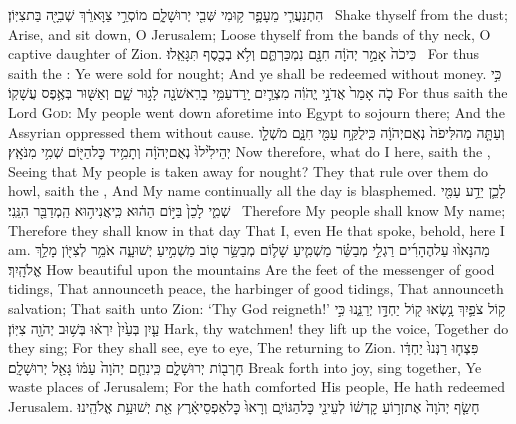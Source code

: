 {הִתְנַעֲרִ֧י מֵעָפָ֛ר ק֥וּמִי שְּׁבִ֖י יְרוּשָׁלָ֑͏ִם  מוֹסְרֵ֣י צַוָּארֵ֔ךְ שְׁבִיָּ֖ה בַּת\maqqaf צִיּֽוֹן׃ \setuma }
{Shake thyself from the dust; Arise, and sit down, O Jerusalem; Loose thyself from the bands of thy neck, O captive daughter of Zion.}
{כִּי\maqqaf כֹה֙ אָמַ֣ר יְהֹוָ֔ה חִנָּ֖ם נִמְכַּרְתֶּ֑ם וְלֹ֥א בְכֶ֖סֶף תִּגָּאֵֽלוּ׃ \setuma }
{For thus saith the \lord: Ye were sold for nought; And ye shall be redeemed without money.}
{כִּ֣י כֹ֤ה אָמַר֙ אֲדֹנָ֣י יֱהֹוִ֔ה מִצְרַ֛יִם יָֽרַד\maqqaf עַמִּ֥י בָרִֽאשֹׁנָ֖ה לָג֣וּר שָׁ֑ם וְאַשּׁ֖וּר בְּאֶ֥פֶס עֲשָׁקֽוֹ׃}
{For thus saith the Lord \textsc{God}: My people went down aforetime into Egypt to sojourn there; And the Assyrian oppressed them without cause.}
{וְעַתָּ֤ה מַה\maqqaf לִּי\maqqaf פֹה֙ נְאֻם\maqqaf יְהֹוָ֔ה כִּֽי\maqqaf לֻקַּ֥ח עַמִּ֖י חִנָּ֑ם מֹשְׁלָ֤ו יְהֵילִ֙ילוּ֙ נְאֻם\maqqaf יְהֹוָ֔ה וְתָמִ֥יד כׇּל\maqqaf הַיּ֖וֹם שְׁמִ֥י מִנֹּאָֽץ׃}
{Now therefore, what do I here, saith the \lord, Seeing that My people is taken away for nought? They that rule over them do howl, saith the \lord, And My name continually all the day is blasphemed.}
{לָכֵ֛ן יֵדַ֥ע עַמִּ֖י שְׁמִ֑י לָכֵן֙ בַּיּ֣וֹם הַה֔וּא כִּֽי\maqqaf אֲנִי\maqqaf ה֥וּא הַֽמְדַבֵּ֖ר הִנֵּֽנִי׃ \setuma }
{Therefore My people shall know My name; Therefore they shall know in that day That I, even He that spoke, behold, here I am.}
{מַה\maqqaf נָּאו֨וּ עַל\maqqaf הֶהָרִ֜ים רַגְלֵ֣י מְבַשֵּׂ֗ר מַשְׁמִ֧יעַ שָׁל֛וֹם מְבַשֵּׂ֥ר ט֖וֹב מַשְׁמִ֣יעַ יְשׁוּעָ֑ה אֹמֵ֥ר לְצִיּ֖וֹן מָלַ֥ךְ אֱלֹהָֽיִךְ׃}
{How beautiful upon the mountains Are the feet of the messenger of good tidings, That announceth peace, the harbinger of good tidings, That announceth salvation; That saith unto Zion: ‘Thy God reigneth!’}
{ק֥וֹל צֹפַ֛יִךְ נָ֥שְׂאוּ ק֖וֹל יַחְדָּ֣ו יְרַנֵּ֑נוּ כִּ֣י עַ֤יִן בְּעַ֙יִן֙ יִרְא֔וּ בְּשׁ֥וּב יְהֹוָ֖ה צִיּֽוֹן׃}
{Hark, thy watchmen! they lift up the voice, Together do they sing; For they shall see, eye to eye, The \lord\space returning to Zion.}
{פִּצְח֤וּ רַנְּנוּ֙ יַחְדָּ֔ו חׇרְב֖וֹת יְרוּשָׁלָ֑͏ִם כִּֽי\maqqaf נִחַ֤ם יְהֹוָה֙ עַמּ֔וֹ גָּאַ֖ל יְרוּשָׁלָֽ͏ִם׃}
{Break forth into joy, sing together, Ye waste places of Jerusalem; For the \lord\space hath comforted His people, He hath redeemed Jerusalem.}
{חָשַׂ֤ף יְהֹוָה֙ אֶת\maqqaf זְר֣וֹעַ קׇדְשׁ֔וֹ לְעֵינֵ֖י כׇּל\maqqaf הַגּוֹיִ֑ם וְרָאוּ֙ כׇּל\maqqaf אַפְסֵי\maqqaf אָ֔רֶץ אֵ֖ת יְשׁוּעַ֥ת אֱלֹהֵֽינוּ׃ \setuma }
